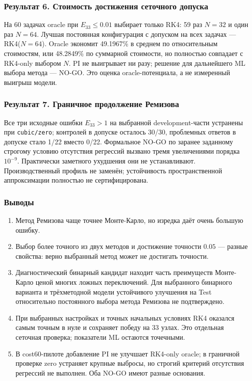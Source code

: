 \documentclass[14pt,a4paper]{extarticle}
\DeclareRobustCommand{\code}[1]{\texttt{\let\savedunderscore\_\def\_{\savedunderscore\allowbreak}#1}}
\begin{document}
\subsubsection*{Результат 6. Стоимость достижения сеточного допуска}
На 60 задачах oracle при $E_{33}\le0.01$ выбирает только RK4:
59 раз $N=32$ и один раз $N=64$. Лучшая постоянная конфигурация
с допуском на всех задачах --- RK4($N=64$). Oracle экономит
49.1967\% в среднем по относительным стоимостям, или 48.2849\%
по суммарной стоимости, но полностью совпадает с RK4-only выбором $N$.
PI не выигрывает ни разу; решение для дальнейшего ML выбора метода ---
NO-GO. Это оценка oracle-потенциала, а не измеренный выигрыш модели.

\subsubsection*{Результат 7. Граничное продолжение Ремизова}
Все три исходные ошибки $E_{33}>1$ на выбранной development-части
устранены при \code{cubic/zero}; контролей в допуске осталось 30/30,
проблемных ответов в допуске стало 1/22 вместо 0/22. Формальное
NO-GO по заранее заданному строгому условию отсутствия регрессий
вызвано тремя увеличениями порядка $10^{-9}$. Практически заметного
ухудшения они не устанавливают. Производственный профиль не заменён;
устойчивость пространственной аппроксимации полностью не сертифицирована.

\subsubsection*{Выводы}
\begin{enumerate}
\item Метод Ремизова чаще точнее Монте-Карло, но изредка даёт очень
большую ошибку.
\item Выбор более точного из двух методов и достижение точности $0.05$ ---
разные свойства: верно выбранный метод может не достигать точности.
\item Диагностический бинарный кандидат находит часть преимуществ
Монте-Карло ценой многих ложных переключений. Для выбранного бинарного
варианта и трёхметодной модели устойчивого улучшения на Test
относительно постоянного выбора метода Ремизова не подтверждено.
\item При выбранных настройках и точных начальных условиях RK4
оказался самым точным в нуле и сохраняет победу на 33 узлах.
Это отдельная сеточная проверка; показатели ML остаются точечными.
\item В cost60-пилоте добавление PI не улучшает RK4-only oracle;
в граничной проверке zero устраняет крупные выбросы, но строгий
критерий отсутствия регрессий не выполнен. Оба NO-GO имеют разные основания.
\end{enumerate}
\endgroup
\clearpage
\tableofcontents
\clearpage
\end{document}
